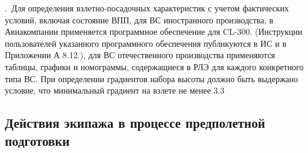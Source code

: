 \thesubsection.\ Для определения взлетно-посадочных характеристик с учетом фактических условий, включая состояние ВПП, для ВС иностранного производства, в Авиакомпании применяется программное обеспечение для CL-300. (Инструкции пользователей указанного программного обеспечения публикуются в ИС и в Приложении А 8.12.), для ВС отечественного производства применяются таблицы, графики и номограммы, содержащиеся в РЛЭ для каждого конкретного типа ВС.
При определении градиентов набора высоты должно быть выдержано условие, что минимальный градиент на взлете не менее 3.3%

\subsection{Действия экипажа в процессе предполетной подготовки}
\setcounter{subsect}{1}

